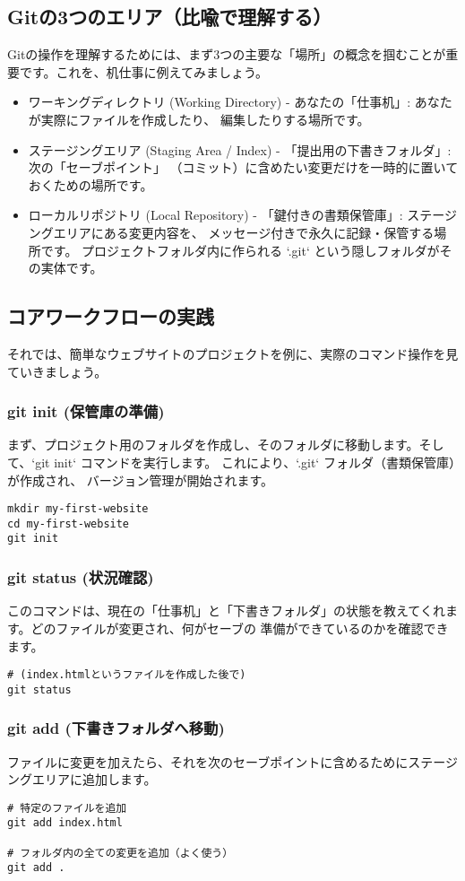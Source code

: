 \documentclass{ltjsarticle}
\begin{document}
\subsection{Gitの3つのエリア（比喩で理解する）}
Gitの操作を理解するためには、まず3つの主要な「場所」の概念を掴むことが重要です。これを、机仕事に例えてみましょう。
\begin{itemize}
    \item ワーキングディレクトリ (Working Directory) - あなたの「仕事机」: あなたが実際にファイルを作成したり、
		編集したりする場所です。
    \item ステージングエリア (Staging Area / Index) - 「提出用の下書きフォルダ」: 次の「セーブポイント」
		（コミット）に含めたい変更だけを一時的に置いておくための場所です。
    \item ローカルリポジトリ (Local Repository) - 「鍵付きの書類保管庫」: ステージングエリアにある変更内容を、
		メッセージ付きで永久に記録・保管する場所です。
    プロジェクトフォルダ内に作られる `.git` という隠しフォルダがその実体です。
\end{itemize}

\subsection{コアワークフローの実践}
それでは、簡単なウェブサイトのプロジェクトを例に、実際のコマンド操作を見ていきましょう。
\subsubsection{git init (保管庫の準備)}
まず、プロジェクト用のフォルダを作成し、そのフォルダに移動します。そして、`git init` コマンドを実行します。
これにより、`.git` フォルダ（書類保管庫）が作成され、
バージョン管理が開始されます。
\begin{verbatim}
mkdir my-first-website
cd my-first-website
git init
\end{verbatim}

\subsubsection{git status (状況確認)}
このコマンドは、現在の「仕事机」と「下書きフォルダ」の状態を教えてくれます。どのファイルが変更され、何がセーブの
準備ができているのかを確認できます。
\begin{verbatim}
# (index.htmlというファイルを作成した後で)
git status
\end{verbatim}

\subsubsection{git add (下書きフォルダへ移動)}
ファイルに変更を加えたら、それを次のセーブポイントに含めるためにステージングエリアに追加します。
\begin{verbatim}
# 特定のファイルを追加
git add index.html

# フォルダ内の全ての変更を追加（よく使う）
git add .
\end{verbatim}
\end{document}

